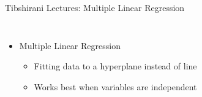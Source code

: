 \documentclass{beamer}
\begin{document}
\begin{frame}{Tibshirani Lectures: Multiple Linear Regression}
\begin{columns}
	\begin{itemize}
		\item<1-> Multiple Linear Regression
		\begin{itemize}
			\item<1-> Fitting data to a hyperplane instead of line
			\item<1-> Works best when variables are independent
		\end{itemize}
	\end{itemize}
\end{columns}	
\end{frame}

\end{document}
